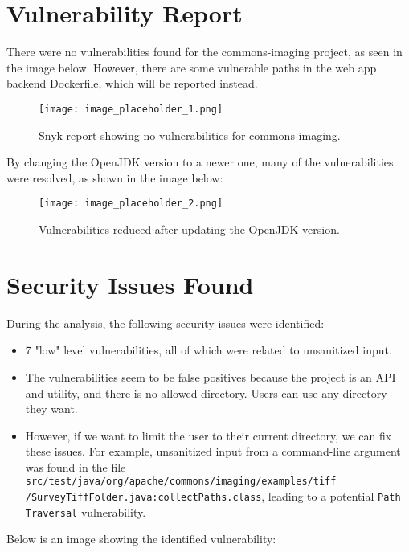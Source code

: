 \documentclass[a4paper,12pt]{report}
\begin{document}
\section{Vulnerability Report}
There were no vulnerabilities found for the commons-imaging project, as seen in the image below. However, there are some vulnerable paths in the web app backend Dockerfile, which will be reported instead.

\begin{figure}[H]
    \centering
    \texttt{[image: image\_placeholder\_1.png]} %
    \caption{Snyk report showing no vulnerabilities for commons-imaging.}
    \label{fig:snyk-report}
\end{figure}

By changing the OpenJDK version to a newer one, many of the vulnerabilities were resolved, as shown in the image below:

\begin{figure}[H]
    \centering
    \texttt{[image: image\_placeholder\_2.png]} %
    \caption{Vulnerabilities reduced after updating the OpenJDK version.}
    \label{fig:openjdk-update}
\end{figure}

\section{Security Issues Found}
During the analysis, the following security issues were identified:
\begin{itemize}
    \item 7 "low" level vulnerabilities, all of which were related to unsanitized input.
    \item The vulnerabilities seem to be false positives because the project is an API and utility, and there is no allowed directory. Users can use any directory they want.
    \item However, if we want to limit the user to their current directory, we can fix these issues. For example, unsanitized input from a command-line argument was found in the file \texttt{src/test/java/org/apache/commons/imaging/examples/tiff \\ /SurveyTiffFolder.java:collectPaths.class}, leading to a potential \texttt{Path Traversal} vulnerability.
\end{itemize}

Below is an image showing the identified vulnerability:
\end{document}
